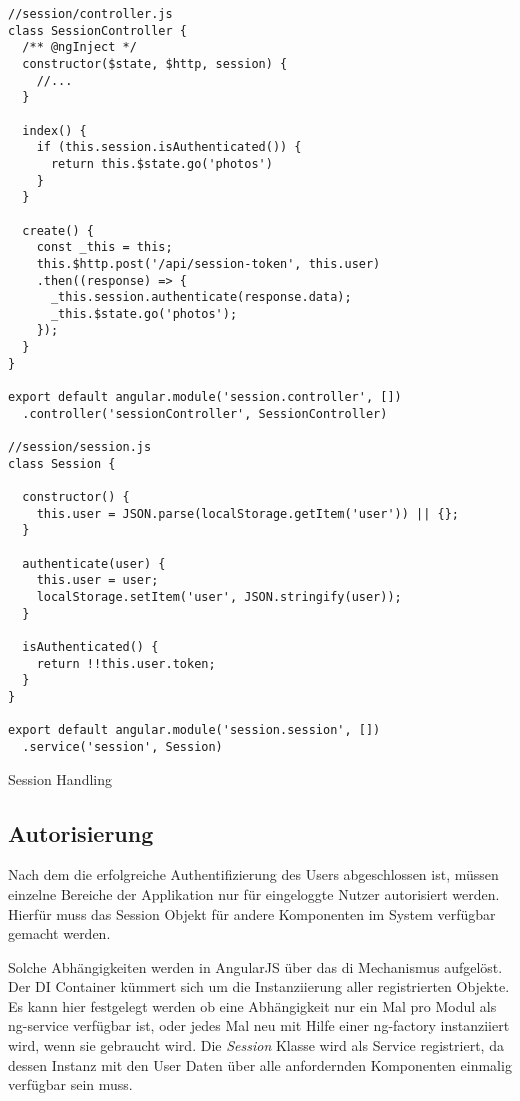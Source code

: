 \begin{listing}[H]
\begin{verbatim}
//session/controller.js
class SessionController {
  /** @ngInject */
  constructor($state, $http, session) {
    //...
  }

  index() {
    if (this.session.isAuthenticated()) {
      return this.$state.go('photos')
    }
  }

  create() {
    const _this = this;
    this.$http.post('/api/session-token', this.user)
    .then((response) => {
      _this.session.authenticate(response.data);
      _this.$state.go('photos');
    });
  }
}

export default angular.module('session.controller', [])
  .controller('sessionController', SessionController)

//session/session.js
class Session {

  constructor() {
    this.user = JSON.parse(localStorage.getItem('user')) || {};
  }

  authenticate(user) {
    this.user = user;
    localStorage.setItem('user', JSON.stringify(user));
  }

  isAuthenticated() {
    return !!this.user.token;
  }
}

export default angular.module('session.session', [])
  .service('session', Session)

\end{verbatim}
\caption{Session Handling}
\label{lst:session_handling}
\end{listing}

\subsection{Autorisierung}

Nach dem die erfolgreiche Authentifizierung des Users abgeschlossen ist, müssen einzelne Bereiche der Applikation nur für eingeloggte Nutzer autorisiert werden. Hierfür muss das Session Objekt für andere Komponenten im System verfügbar gemacht werden. 

Solche Abhängigkeiten werden in AngularJS über das \gls{di} Mechanismus aufgelöst. Der DI Con­tai­ner kümmert sich um die Instanziierung aller registrierten Objekte. Es kann hier festgelegt werden ob eine Abhängigkeit nur ein Mal pro Modul als \gls{ng-service} verfügbar ist, oder jedes Mal neu mit Hilfe einer \gls{ng-factory} instanziiert wird, wenn sie gebraucht wird. 
Die \textit{Session} Klasse wird als Service registriert, da dessen Instanz mit den User Daten über alle anfordernden Komponenten einmalig verfügbar sein muss. 

